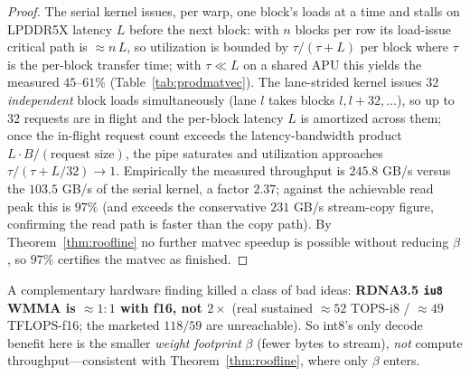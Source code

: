 \documentclass[11pt]{article}
\begin{document}
\begin{proof}
The serial kernel issues, per warp, one block's loads at a time and stalls on LPDDR5X latency $L$ before the next block: with $n$ blocks per row its load-issue critical path is $\approx n\,L$, so utilization is bounded by $\tau/(\tau+L)$ per block where $\tau$ is the per-block transfer time; with $\tau \ll L$ on a shared APU this yields the measured $45$--$61\%$ (Table~\ref{tab:prodmatvec}). The lane-strided kernel issues $32$ \emph{independent} block loads simultaneously (lane $l$ takes blocks $l, l{+}32, \dots$), so up to $32$ requests are in flight and the per-block latency $L$ is amortized across them; once the in-flight request count exceeds the latency-bandwidth product $L\cdot B/(\text{request size})$, the pipe saturates and utilization approaches $\tau/(\tau+L/32)\to 1$. Empirically the measured throughput is $245.8$ GB/s versus the $103.5$ GB/s of the serial kernel, a factor $2.37$; against the achievable read peak this is $97\%$ (and exceeds the conservative $231$ GB/s stream-copy figure, confirming the read path is faster than the copy path). By Theorem~\ref{thm:roofline} no further matvec speedup is possible without reducing $\beta$, so $97\%$ certifies the matvec as finished.
\end{proof}

A complementary hardware finding killed a class of bad ideas: \textbf{RDNA3.5 \texttt{iu8} WMMA is $\approx 1{:}1$ with f16, not $2\times$} (real sustained $\approx 52$ TOPS-i8 / $\approx 49$ TFLOPS-f16; the marketed $118/59$ are unreachable). So int8's only decode benefit here is the smaller \emph{weight footprint} $\beta$ (fewer bytes to stream), \emph{not} compute throughput---consistent with Theorem~\ref{thm:roofline}, where only $\beta$ enters.
\end{document}
